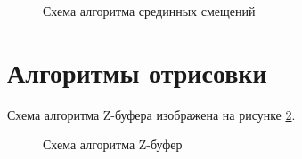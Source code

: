 \begin{figure}[ph!]
	\caption{Схема алгоритма срединных смещений}
	\label{fig:brown_mov_alg}
\end{figure}

\clearpage

\section{Алгоритмы отрисовки}

Схема алгоритма Z-буфера изображена на рисунке \ref{fig:z_buf_alg}.

\begin{figure}[ph!]
	\caption{Схема алгоритма Z-буфер}
	\label{fig:z_buf_alg}
\end{figure}

\clearpage

